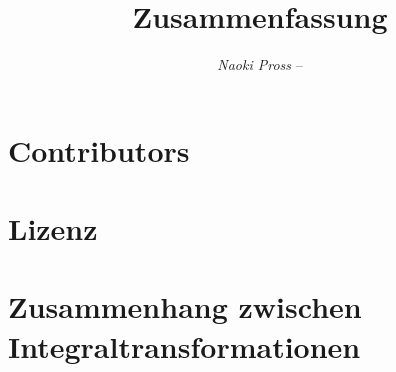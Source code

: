 \documentclass[margin=normal]{tex/hsrzf}
\author{\textsl{Naoki Pross} -- \texttt{\theauthoremail}}
\title{\texttt{\themodule} Zusammenfassung}
\date{\thesemester}
\begin{document}
\maketitle
\tableofcontents
\section*{Contributors}
\thecontributors
\section*{Lizenz}
\doclicenseThis

\clearpage

\section{Zusammenhang zwischen Integraltransformationen}
\begin{figure}[H] \centering
  
\end{figure}







\end{document}
